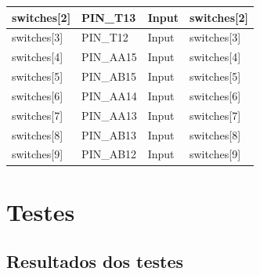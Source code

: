 \documentclass[12pt, a4paper]{article}
\begin{document}
\begin{table}[H]
\begin{center}
\begin{tabular}{|l|l|l|l|}
				switches{[}2{]}       & PIN\_T13  & Input  & switches{[}2{]}  \\ \hline
				switches{[}3{]}       & PIN\_T12  & Input  & switches{[}3{]}  \\ \hline
				switches{[}4{]}       & PIN\_AA15 & Input  & switches{[}4{]}  \\ \hline
				switches{[}5{]}       & PIN\_AB15 & Input  & switches{[}5{]}  \\ \hline
				switches{[}6{]}       & PIN\_AA14 & Input  & switches{[}6{]}  \\ \hline
				switches{[}7{]}       & PIN\_AA13 & Input  & switches{[}7{]}  \\ \hline
				switches{[}8{]}       & PIN\_AB13 & Input  & switches{[}8{]}  \\ \hline
				switches{[}9{]}       & PIN\_AB12 & Input  & switches{[}9{]}  \\ \hline
			\end{tabular}
		\end{center}
	\end{table}
	
	
	
	\section*{Testes}
	
	\subsection*{Resultados dos testes}
\end{document}
